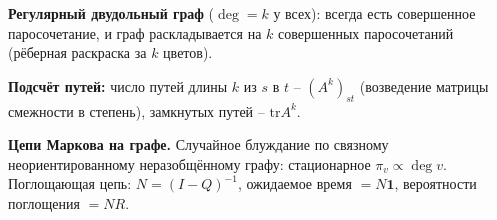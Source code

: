 \par \textbf{Регулярный двудольный граф} ($\deg=k$ у всех): всегда есть совершенное паросочетание, и граф раскладывается на $k$ совершенных паросочетаний (рёберная раскраска за $k$ цветов).
\par \textbf{Подсчёт путей:} число путей длины $k$ из $s$ в $t$ -- $(A^k)_{st}$ (возведение матрицы смежности в степень), замкнутых путей -- $\mathrm{tr}A^k$.
\par \textbf{Цепи Маркова на графе.} Случайное блуждание по связному неориентированному неразобщённому графу: стационарное $\pi_v\propto\deg v$. Поглощающая цепь: $N=(I-Q)^{-1}$, ожидаемое время $=N\mathbf1$, вероятности поглощения $=NR$.
